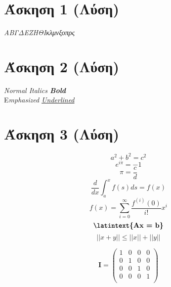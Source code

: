 \documentclass[a4paper,11pt]{article}
\newcommand{\lt}{\latintext}
\begin{document}
			
		

\section{Άσκηση 1 (Λύση)}
	
	\begin{center}
		\emph{{\tiny Α}{\scriptsize Β}{\footnotesize Γ}{\small Δ}{\normalsize Ε}{\large Ζ}{\Large Η}{\LARGE Θ}{\huge Ι}{\huge κ}{\LARGE λ}{\Large μ}{\large ν}{\normalsize ξ}{\small ο}{\footnotesize π}{\scriptsize ρ}{\tiny ς}}
	\end{center}

\vspace{20pt}

\section{Άσκηση 2 (Λύση)}

	\begin{center}	
		\lt
		\textit{Normal Italics \textbf{Bold\\}}
		{E}\textit{mphasized \underline{Underlined}}
	\end{center}

\section{Άσκηση 3 (Λύση)}
	
	\begin{equation*}
	a^2 + b^2 = c^2
	\end{equation*}
	\begin{equation*}
	e^{i\pi} = -1
	\end{equation*}
	\begin{equation*}
	\pi = \frac{c}{d}
	\end{equation*}
	\begin{equation*}
	\dfrac{d}{dx}\int_{a}^{x} f(s) ds = f(x)
	\end{equation*}
	\begin{equation*}
	f(x) = \sum_{i=0}^{\infty } {\dfrac{f^{(i)}(0)}{i!} x^i }
	\end{equation*}
	\begin{equation*}
	\textbf{\lt{Ax = b}}
	\end{equation*}
	\begin{equation*}
	||{x+y}||\leq||x||+||y||
	\end{equation*}
	
	\quad
	
	\begin{equation}
	\textbf{I} = 
	\begin{pmatrix}
	1&0&0&0 \\
	0&1&0&0 \\
	0&0&1&0 \\
	0&0&0&1 \\
	\end{pmatrix}
	\end{equation}
	
\end{document}
